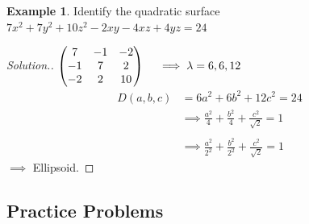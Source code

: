 \documentclass[11pt,a4paper]{article}
\theoremstyle{definition}
\newtheorem{exa}[thm]{Example}
\newenvironment{solution}
  {\renewcommand{\qedsymbol}{}\begin{proof}[\textit{Solution}.]}
  {\end{proof}}
\begin{document}
\begin{exa}
Identify the quadratic surface $7x^2+7y^2+10z^2-2xy-4xz+4yz=24$
\end{exa}
\begin{solution}
$
\begin{pmatrix}
7&-1&-2\\-1&7&2\\-2&2&10\\
\end{pmatrix}
\hspace{0.4cm} \implies \lambda =6,6,12$
\begin{align*}
D(a,b,c) &=6a^2+6b^2+12c^2=24\\
         &\implies \frac{a^2}{4}+\frac{b^2}{4}+\frac{c^2}{\sqrt{2}}=1\\\\
         &\implies \frac{a^2}{2^2}+\frac{b^2}{2^2}+\frac{c^2}{\sqrt{2}}=1
\end{align*}
$\implies$ Ellipsoid.
\end{solution}

\subsection{Practice Problems}
\end{document}
